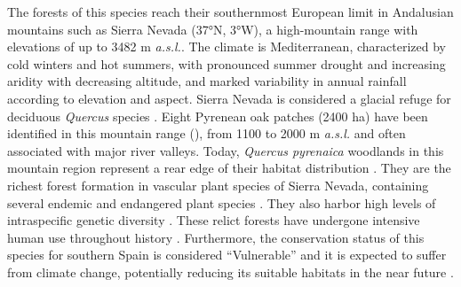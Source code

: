 The forests of this species reach their southernmost European limit in Andalusian mountains such as Sierra Nevada (37°N, 3°W), a high-mountain range with elevations of up to 3482 m \emph{a.s.l.}. The climate is Mediterranean, characterized by cold winters and hot summers, with pronounced summer drought and increasing aridity with decreasing altitude, and marked variability in annual rainfall according to elevation and aspect. Sierra Nevada is considered a glacial refuge for deciduous \emph{Quercus} species \autocite{Olaldeetal2002WhiteOaks}. Eight Pyrenean oak patches (2400 ha) have been identified in this mountain range (), from 1100 to 2000 m \emph{a.s.l.} and often associated with major river valleys. Today, \emph{Quercus pyrenaica} woodlands in this mountain region represent a rear edge of their habitat distribution \autocite{HampePetit2005ConservingBiodiversity}. They are the richest forest formation in vascular plant species of Sierra Nevada, containing several endemic and endangered plant species \autocite{Loriteetal2008PhytosociologicalReview}. They also harbor high levels of intraspecific genetic diversity \autocite{ValbuenaCarabanaGil2013GeneticResilience}. These relict forests have undergone intensive human use throughout history \autocite{CamachoOlmedoetal2002DinamicaEvolutiva}. Furthermore, the conservation status of this species for southern Spain is considered ``Vulnerable'' and it is expected to suffer from climate change, potentially reducing its suitable habitats in the near future \autocite{GeaIzquierdoetal2013GrowthProjections,GeaIzquierdoetal2017RiskyFuture}.
